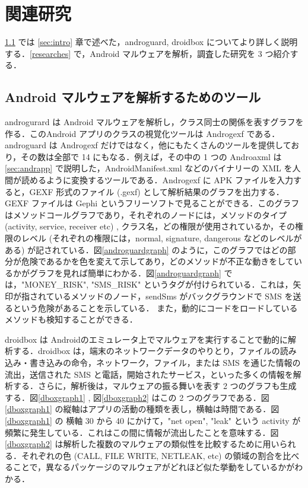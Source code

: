 \section{関連研究}
\ref{tools} では \ref{sec:intro} 章で述べた，androguard, droidbox についてより詳しく説明する．\ref{researches} で，Android マルウェアを解析，調査した研究を 3 つ紹介する．
\subsection{Android マルウェアを解析するためのツール}
\label{tools}
androgurard \cite{aguard} は Android マルウェアを解析し，クラス同士の関係を表すグラフを作る．このAndroid アプリのクラスの視覚化ツールは Androgexf である．androguard  は Androgexf だけではなく，他にもたくさんのツールを提供しており，その数は全部で 14 にもなる．例えば，その中の 1 つの Androaxml は\ref{sec:andrapp} で説明した，AndroidManifest.xml などのバイナリーの XML を人間が読めるように変換するツールである．Androgexf  に APK ファイルを入力すると，GEXF 形式のファイル (.gexf) として解析結果のグラフを出力する．GEXF ファイルは Gephi というフリーソフトで見ることができる．このグラフはメソッドコールグラフであり，それぞれのノードには，メソッドのタイプ (activity, service, receiver etc) , クラス名，どの権限が使用されているか，その権限のレベル (それぞれの権限には，normal, signature, dangerous などのレベルがある) が記されている．図\ref{androguardgraph} のように，このグラフではどの部分が危険であるかを色を変えて示してあり，どのメソッドが不正な動きをしているかがグラフを見れば簡単にわかる．図\ref{androguardgraph} では，"MONEY\_RISK", "SMS\_RISK" というタグが付けられている．これは，矢印が指されているメソッドのノード，sendSms がバックグラウンドで SMS を送るという危険があることを示している． また，動的にコードをロードしているメソッドも検知することができる．

droidbox \cite{dbox} は Androidのエミュレータ上でマルウェアを実行することで動的に解析する．droidbox  は，端末のネットワークデータのやりとり，ファイルの読み込み・書き込みの命令，ネットワーク，ファイル，または SMS を通じた情報の流出，送信された SMS と電話，開始されたサービス，といった多くの情報を解析する．さらに，解析後は，マルウェアの振る舞いを表す 2 つのグラフも生成する．図\ref{dboxgraph1} , 図\ref{dboxgraph2} はこの 2 つのグラフである．図\ref{dboxgraph1} の縦軸はアプリの活動の種類を表し，横軸は時間である．図\ref{dboxgraph1} の 横軸  30 から 40 にかけて，"net open", "leak" という activity が頻繁に発生している．これはこの間に情報が流出したことを意味する．図\ref{dboxgraph2} は解析した複数のマルウェアの類似性を比較するために用いられる．それぞれの色 (CALL, FILE WRITE, NETLEAK, etc) の領域の割合を比べることで，異なるパッケージのマルウェアがどれほど似た挙動をしているかがわかる．

